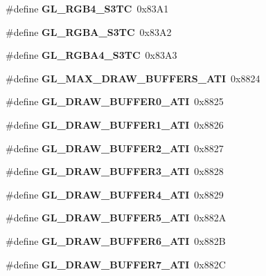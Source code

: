 \begin{DoxyCompactItemize}
\item 
\#define {\bfseries G\+L\+\_\+\+R\+G\+B4\+\_\+\+S3\+T\+C}~0x83\+A1\label{_s_d_l__opengl_8h_ad7fc8ca0fb65379a1874c2b5a4620f6f}

\item 
\#define {\bfseries G\+L\+\_\+\+R\+G\+B\+A\+\_\+\+S3\+T\+C}~0x83\+A2\label{_s_d_l__opengl_8h_a4232f53d827219c560c108d801e4fd95}

\item 
\#define {\bfseries G\+L\+\_\+\+R\+G\+B\+A4\+\_\+\+S3\+T\+C}~0x83\+A3\label{_s_d_l__opengl_8h_a74c46641ddd450321a197c8f7626407f}

\item 
\#define {\bfseries G\+L\+\_\+\+M\+A\+X\+\_\+\+D\+R\+A\+W\+\_\+\+B\+U\+F\+F\+E\+R\+S\+\_\+\+A\+T\+I}~0x8824\label{_s_d_l__opengl_8h_a171e71b9241a9fe8a8b6250b2fae0bac}

\item 
\#define {\bfseries G\+L\+\_\+\+D\+R\+A\+W\+\_\+\+B\+U\+F\+F\+E\+R0\+\_\+\+A\+T\+I}~0x8825\label{_s_d_l__opengl_8h_a59a80fbfd8b46b620efacbbdb96ed01c}

\item 
\#define {\bfseries G\+L\+\_\+\+D\+R\+A\+W\+\_\+\+B\+U\+F\+F\+E\+R1\+\_\+\+A\+T\+I}~0x8826\label{_s_d_l__opengl_8h_ad376527a87f1cd365e77a0be967f437d}

\item 
\#define {\bfseries G\+L\+\_\+\+D\+R\+A\+W\+\_\+\+B\+U\+F\+F\+E\+R2\+\_\+\+A\+T\+I}~0x8827\label{_s_d_l__opengl_8h_a9d8db54c6ea36fd542a7598c1d7f894f}

\item 
\#define {\bfseries G\+L\+\_\+\+D\+R\+A\+W\+\_\+\+B\+U\+F\+F\+E\+R3\+\_\+\+A\+T\+I}~0x8828\label{_s_d_l__opengl_8h_a28711e3d23ff6068bdfcf457a60aae92}

\item 
\#define {\bfseries G\+L\+\_\+\+D\+R\+A\+W\+\_\+\+B\+U\+F\+F\+E\+R4\+\_\+\+A\+T\+I}~0x8829\label{_s_d_l__opengl_8h_a0b01b29697616c7aafb831706e09eaec}

\item 
\#define {\bfseries G\+L\+\_\+\+D\+R\+A\+W\+\_\+\+B\+U\+F\+F\+E\+R5\+\_\+\+A\+T\+I}~0x882\+A\label{_s_d_l__opengl_8h_ab7f9ea52a6dfd1eefb41446d6d6acbd7}

\item 
\#define {\bfseries G\+L\+\_\+\+D\+R\+A\+W\+\_\+\+B\+U\+F\+F\+E\+R6\+\_\+\+A\+T\+I}~0x882\+B\label{_s_d_l__opengl_8h_a40f5e813c82ba1ed34dca87d8dd48972}

\item 
\#define {\bfseries G\+L\+\_\+\+D\+R\+A\+W\+\_\+\+B\+U\+F\+F\+E\+R7\+\_\+\+A\+T\+I}~0x882\+C\label{_s_d_l__opengl_8h_a651b8b2a2de6ba2a3f5dc3835ebf0206}


\end{DoxyCompactItemize}
